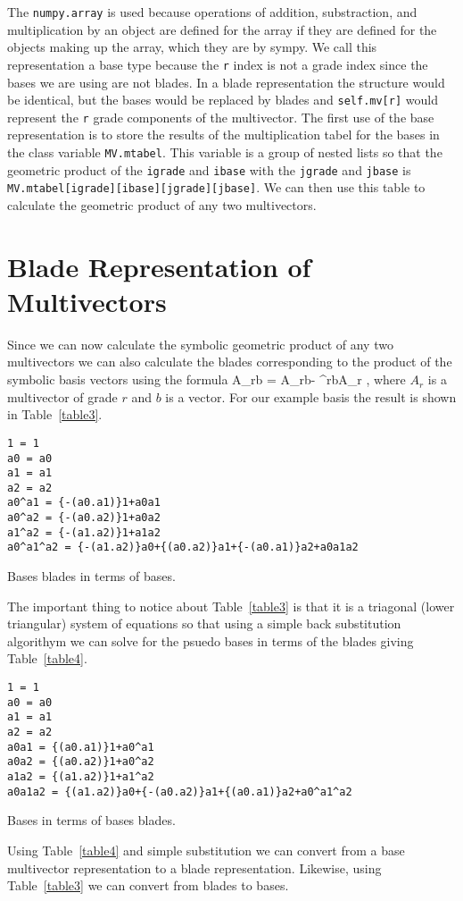 \documentclass{article}
\begin{document}
The {\tt numpy.array} is used because operations of addition, substraction, and multiplication by an object are
defined for the array if they are defined for the objects making up the array, which they are by sympy. 
We call this representation a base type because the {\tt r} index is not a grade index since the bases we are using are not blades. In a blade representation the structure would be identical, but the bases would be replaced by 
blades and {\tt self.mv[r]} would represent the {\tt r} grade components of the multivector.  The first use of the
base representation is to store the results of the multiplication tabel for the bases in the class variable {\tt MV.mtabel}.  This variable is a group of nested lists so that the geometric product of the {\tt igrade} and 
{\tt ibase} with the {\tt jgrade} and {\tt jbase} is {\tt MV.mtabel[igrade][ibase][jgrade][jbase]}.  We can then use this table to calculate the geometric product of any two multivectors.

\section{Blade Representation of Multivectors}

Since we can now calculate the symbolic geometric product of any two multivectors we can also calculate the
blades corresponding to the product of the symbolic basis vectors using the formula
\be
	A_{r}\W b = \half\lp A_{r}b- \rp^{r}bA_{r} \rp,
\ee
where $A_{r}$ is a multivector of grade $r$ and $b$ is a vector.  For our example basis the result 
is shown in Table~\ref{table3}.
\begin{table}[h]
\begin{verbatim}
1 = 1
a0 = a0
a1 = a1
a2 = a2
a0^a1 = {-(a0.a1)}1+a0a1
a0^a2 = {-(a0.a2)}1+a0a2
a1^a2 = {-(a1.a2)}1+a1a2
a0^a1^a2 = {-(a1.a2)}a0+{(a0.a2)}a1+{-(a0.a1)}a2+a0a1a2
\end{verbatim}
\caption{Bases blades in terms of bases.}\label{table3}
\end{table}
The important thing to notice about Table~\ref{table3} is that it is a triagonal (lower triangular) system of equations so that
using a simple back substitution algorithym we can solve for the psuedo bases in terms of the blades giving Table~\ref{table4}.  
\begin{table}[h]
\begin{verbatim}
1 = 1
a0 = a0
a1 = a1
a2 = a2
a0a1 = {(a0.a1)}1+a0^a1
a0a2 = {(a0.a2)}1+a0^a2
a1a2 = {(a1.a2)}1+a1^a2
a0a1a2 = {(a1.a2)}a0+{-(a0.a2)}a1+{(a0.a1)}a2+a0^a1^a2
\end{verbatim}
\caption{Bases in terms of bases blades.}\label{table4}
\end{table}
Using Table~\ref{table4} and simple substitution we can convert from a base multivector representation to a
blade representation.  Likewise, using Table~\ref{table3} we can convert from 
blades to bases.
\end{document}
